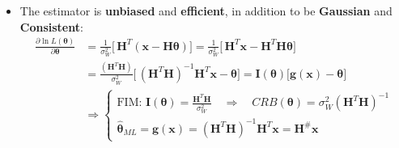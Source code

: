 \begin{itemize}
\begin{align*}
MSE\!\left\{\hat{\boldsymbol{\theta}}_{ML}\right\}
&= E\!\left\{(\hat{\boldsymbol{\theta}}_{ML} - \boldsymbol{\theta})
             (\hat{\boldsymbol{\theta}}_{ML} - \boldsymbol{\theta})^{T}\right\}
 = E\!\left\{(\mathbf{H}^{\#}\mathbf{X} - \boldsymbol{\theta})
             (\mathbf{H}^{\#}\mathbf{X} - \boldsymbol{\theta})^{T}\right\} \\[4pt]
&= E\!\left\{(\mathbf{H}^{\#}\mathbf{H}\boldsymbol{\theta}
             + \mathbf{H}^{\#}\mathbf{W} - \boldsymbol{\theta})
             (\mathbf{H}^{\#}\mathbf{H}\boldsymbol{\theta}
             + \mathbf{H}^{\#}\mathbf{W} - \boldsymbol{\theta})^{T}\right\} \\[4pt]
&= E\!\left\{(\mathbf{H}^{\#}\mathbf{W})
             (\mathbf{H}^{\#}\mathbf{W})^{T}\right\}
 = \mathbf{H}^{\#} E\!\left\{\mathbf{W}\mathbf{W}^{T}\right\}
   (\mathbf{H}^{\#})^{T} \\[4pt]
&= \sigma_W^{2}
   (\mathbf{H}^{T}\mathbf{H})^{-1}\mathbf{H}^{T}
   \left[\,(\mathbf{H}^{T}\mathbf{H})^{-1}\mathbf{H}^{T}\right]^{T} \\[4pt]
&= \sigma_W^{2}(\mathbf{H}^{T}\mathbf{H})^{-1}
\end{align*}
\item The estimator is \textbf{unbiased} and \textbf{efficient}, in addition to be \textbf{Gaussian} and \textbf{Consistent}:
\begin{align*}
\frac{\partial \ln L(\boldsymbol{\theta})}{\partial \boldsymbol{\theta}}
&= \frac{1}{\sigma_W^{2}}
   \Big[\, \mathbf{H}^{T}(\mathbf{x} - \mathbf{H}\boldsymbol{\theta}) \Big]
 = \frac{1}{\sigma_W^{2}}
   \Big[\, \mathbf{H}^{T}\mathbf{x} - \mathbf{H}^{T}\mathbf{H}\boldsymbol{\theta} \Big] \\[4pt]
&= \frac{(\mathbf{H}^{T}\mathbf{H})}{\sigma_W^{2}}
   \Big[\, (\mathbf{H}^{T}\mathbf{H})^{-1}\mathbf{H}^{T}\mathbf{x} - \boldsymbol{\theta} \Big]
 = \mathbf{I}(\boldsymbol{\theta})\big[\mathbf{g}(\mathbf{x}) - \boldsymbol{\theta}\big]\\[4pt]
&\Rightarrow
\begin{cases}
\text{FIM: } \mathbf{I}(\boldsymbol{\theta})
 = \frac{\mathbf{H}^{T}\mathbf{H}}{\sigma_W^{2}}
 \quad \Longrightarrow \quad
 CRB(\boldsymbol{\theta})
 = \sigma_W^{2}(\mathbf{H}^{T}\mathbf{H})^{-1} \\
 \hat{\boldsymbol{\theta}}_{ML}
 = \mathbf{g}(\mathbf{x})
 = (\mathbf{H}^{T}\mathbf{H})^{-1}\mathbf{H}^{T}\mathbf{x}
 = \mathbf{H}^{\#}\mathbf{x}
\end{cases}
\end{align*}


\end{itemize}
